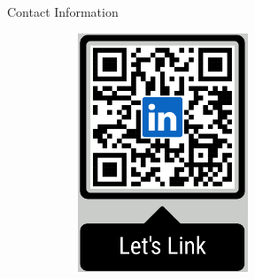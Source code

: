 \documentclass{beamer} %
\begin{document}
\begin{frame}[t]
\begin{columns}[t]
\begin{column}{0.3\textwidth}
\begin{block}{Contact Information}
\begin{figure}
\begin{subfigure}[t]{0.25\linewidth}
						\includegraphics[width=2in,valign=t]{qr_linked_v5.png}
					\end{subfigure}
				\end{figure}
			\end{block}

		\end{column} %

		\begin{column}{0.02\textwidth}\end{column} %

	\end{columns} %

\end{frame} %

\end{document}
